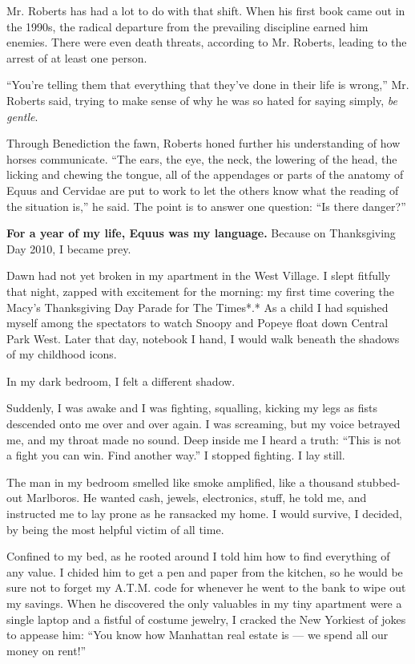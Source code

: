 Mr. Roberts has had a lot to do with that shift. When his first book
came out in the 1990s, the radical departure from the prevailing
discipline earned him enemies. There were even death threats, according
to Mr. Roberts, leading to the arrest of at least one person.

``You're telling them that everything that they've done in their life is
wrong,'' Mr. Roberts said, trying to make sense of why he was so hated
for saying simply, \emph{be gentle}.

Through Benediction the fawn, Roberts honed further his understanding of
how horses communicate. ``The ears, the eye, the neck, the lowering of
the head, the licking and chewing the tongue, all of the appendages or
parts of the anatomy of Equus and Cervidae are put to work to let the
others know what the reading of the situation is,'' he said. The point
is to answer one question: ``Is there danger?''

\textbf{For a year of my life, Equus was my language.} Because on
Thanksgiving Day 2010, I became prey.

Dawn had not yet broken in my apartment in the West Village. I slept
fitfully that night, zapped with excitement for the morning: my first
time covering the Macy's Thanksgiving Day Parade for The Times*.* As a
child I had squished myself among the spectators to watch Snoopy and
Popeye float down Central Park West. Later that day, notebook I hand, I
would walk beneath the shadows of my childhood icons.

In my dark bedroom, I felt a different shadow.

Suddenly, I was awake and I was fighting, squalling, kicking my legs as
fists descended onto me over and over again. I was screaming, but my
voice betrayed me, and my throat made no sound. Deep inside me I heard a
truth: ``This is not a fight you can win. Find another way.'' I stopped
fighting. I lay still.

The man in my bedroom smelled like smoke amplified, like a thousand
stubbed-out Marlboros. He wanted cash, jewels, electronics, stuff, he
told me, and instructed me to lay prone as he ransacked my home. I would
survive, I decided, by being the most helpful victim of all time.

Confined to my bed, as he rooted around I told him how to find
everything of any value. I chided him to get a pen and paper from the
kitchen, so he would be sure not to forget my A.T.M. code for whenever
he went to the bank to wipe out my savings. When he discovered the only
valuables in my tiny apartment were a single laptop and a fistful of
costume jewelry, I cracked the New Yorkiest of jokes to appease him:
``You know how Manhattan real estate is --- we spend all our money on
rent!''

